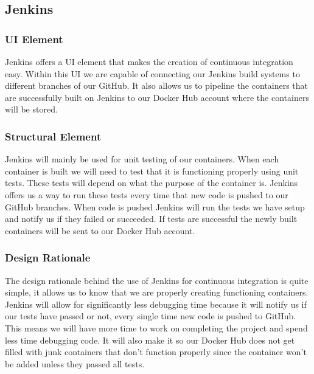 \documentclass[onecolumn, draftclsnofoot,10pt, compsoc]{IEEEtran}
\begin{document}
\subsection{Jenkins}
\subsubsection{UI Element}
Jenkins offers a UI element that makes the creation of continuous integration easy. Within this UI we are capable of connecting our Jenkins build systems to different branches of our GitHub. It also allows us to pipeline the containers that are successfully built on Jenkins to our Docker Hub account where the containers will be stored. 
\subsubsection{Structural Element}
Jenkins will mainly be used for unit testing of our containers. When each container is built we will need to test that it is functioning properly using unit tests. These tests will depend on what the purpose of the container is. Jenkins offers us a way to run these tests every time that new code is pushed to our GitHub branches. When code is pushed Jenkins will run the tests we have setup and notify us if they failed or succeeded. If tests are successful the newly built containers will be sent to our Docker Hub account.
\subsubsection{Design Rationale}
The design rationale behind the use of Jenkins for continuous integration is quite simple, it allows us to know that we are properly creating functioning containers. Jenkins will allow for significantly less debugging time because it will notify us if our tests have passed or not, every single time new code is pushed to GitHub. This means we will have more time to work on completing the project and spend less time debugging code. It will also make it so our Docker Hub does not get filled with junk containers that don't function properly since the container won't be added unless they passed all tests.


\end{document}
